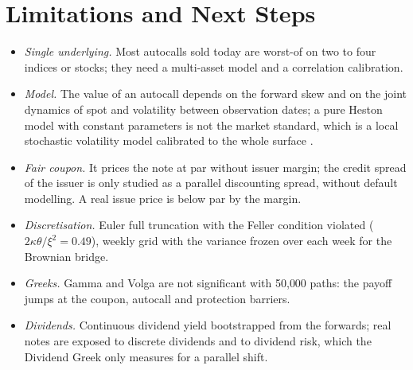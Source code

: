 \documentclass[11pt,a4paper]{article}
\begin{document}
\section{Limitations and Next Steps}\label{sec:limitations}
\begin{itemize}
\item \emph{Single underlying.} Most autocalls sold today are worst-of on two to four indices or stocks; they need
a multi-asset model and a correlation calibration.
\item \emph{Model.} The value of an autocall depends on the forward skew and on the joint dynamics of spot and
volatility between observation dates; a pure Heston model with constant parameters is not the market standard,
which is a local stochastic volatility model calibrated to the whole surface \cite{bergomi2016}.
\item \emph{Fair coupon.} It prices the note at par without issuer margin; the credit spread of the issuer is only
studied as a parallel discounting spread, without default modelling. A real issue price is below par by the margin.
\item \emph{Discretisation.} Euler full truncation with the Feller condition violated ($2\kappa\theta/\xi^2 = 0.49$),
weekly grid with the variance frozen over each week for the Brownian bridge.
\item \emph{Greeks.} Gamma and Volga are not significant with 50{,}000 paths: the payoff jumps at the coupon,
autocall and protection barriers.
\item \emph{Dividends.} Continuous dividend yield bootstrapped from the forwards; real notes are exposed to
discrete dividends and to dividend risk, which the Dividend Greek only measures for a parallel shift.
\end{itemize}

\end{document}
